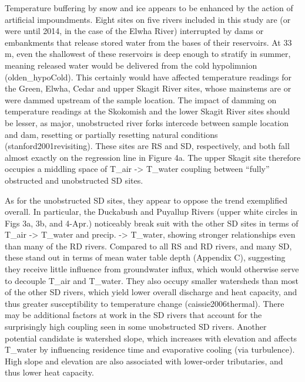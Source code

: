 Temperature buffering by snow and ice appears to be enhanced by the action of artificial impoundments. Eight sites on five rivers included in this study are (or were until 2014, in the case of the Elwha River) interrupted by dams or embankments that release stored water from the bases of their reservoirs. At 33 m, even the shallowest of these reservoirs is deep enough to stratify in summer, meaning released water would be delivered from the cold hypolimnion (olden_hypoCold). This certainly would have affected temperature readings for the Green, Elwha, Cedar and upper Skagit River sites, whose mainstems are or were dammed upstream of the sample location. The impact of damming on temperature readings at the Skokomish and the lower Skagit River sites should be lesser, as major, unobstructed river forks intercede between sample location and dam, resetting or partially resetting natural conditions (stanford2001revisiting). These sites are RS and SD, respectively, and both fall almost exactly on the regression line in Figure 4a. The upper Skagit site therefore occupies a middling space of T_{air} -> T_{water} coupling between ``fully'' obstructed and unobstructed SD sites.

As for the unobstructed SD sites, they appear to oppose the trend exemplified overall. In particular, the Duckabush and Puyallup Rivers (upper white circles in Figs 3a, 3b, and 4-Apr.) noticeably break suit with the other SD sites in terms of T_{air} -> T_{water} and precip. -> T_{water}, showing stronger relationships even than many of the RD rivers. Compared to all RS and RD rivers, and many SD, these stand out in terms of mean water table depth (Appendix C), suggesting they receive little influence from groundwater influx, which would otherwise serve to decouple T_{air} and T_{water}. They also occupy smaller watersheds than most of the other SD rivers, which yield lower overall discharge and heat capacity, and thus greater susceptibility to temperature change (caissie2006thermal). There may be additional factors at work in the SD rivers that account for the surprisingly high coupling seen in some unobstructed SD rivers. Another potential candidate is watershed slope, which increases with elevation and affects T_water by influencing residence time and evaporative cooling (via turbulence). High slope and elevation are also associated with lower-order tributaries, and thus lower heat capacity. 

